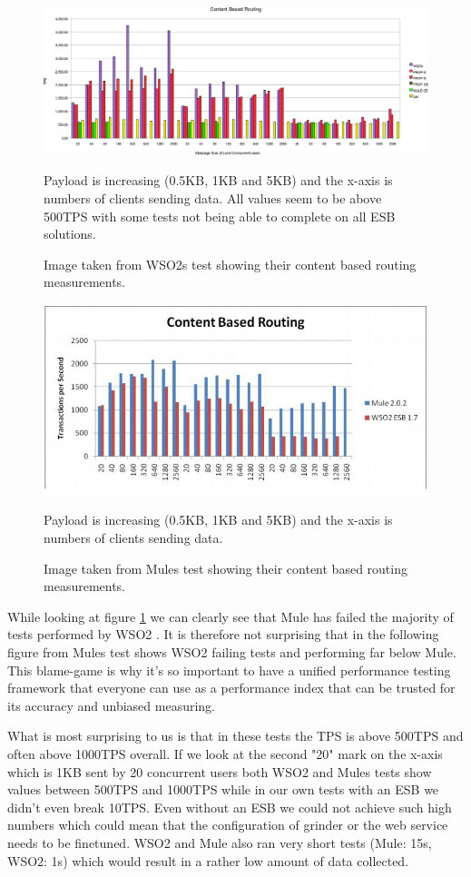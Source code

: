 \begin{figure}[H]
	\caption{Image taken from WSO2s test \cite{Perera07R3} showing their content based routing measurements.}
	\centerline{\includegraphics[scale=0.43]{img/WSO2_cbr_chart}}
	\label{fig:wso2_cbr}
	Payload is increasing (0.5KB, 1KB and 5KB) and the x-axis is numbers of clients sending data. 
	All values seem to be above 500TPS with some tests not being able to complete on all ESB solutions.
\end{figure}
\begin{figure}[H]
	\caption{Image taken from Mules test \cite{mulesoft08} showing their content based routing measurements.}
	\centerline{\includegraphics[scale=1]{img/MULE_cbr_chart}}
	\label{fig:mule_cbr}
	Payload is increasing (0.5KB, 1KB and 5KB) and the x-axis is numbers of clients sending data. 
\end{figure}
While looking at figure \ref{fig:wso2_cbr} we can clearly see that Mule has failed the majority of tests performed by WSO2 \cite{Perera07R3}. 
It is therefore not surprising that in the following figure from Mules test \cite{mulesoft08} shows WSO2 failing tests and performing far below Mule.
This blame-game is why it's so important to have a unified performance testing framework that everyone can use as a performance index that can be trusted for its accuracy and unbiased measuring.

What is most surprising to us is that in these tests the TPS is above 500TPS and often above 1000TPS overall. 
If we look at the second "20" mark on the x-axis which is 1KB sent by 20 concurrent users both WSO2 and Mules tests show values between 500TPS and 1000TPS while in our own tests with an ESB we didn't even break 10TPS.
Even without an ESB we could not achieve such high numbers which could mean that the configuration of grinder or the web service needs to be finetuned. 
WSO2 and Mule also ran very short tests (Mule: 15s, WSO2: 1s) which would result in a rather low amount of data collected.

